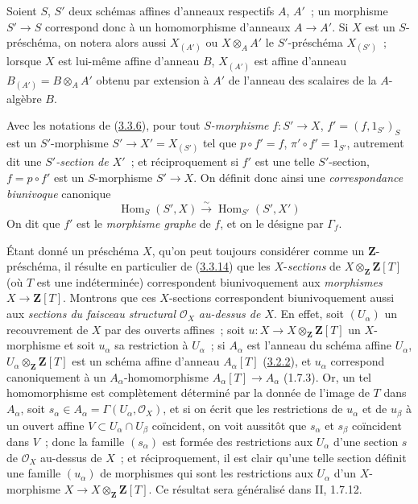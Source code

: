\begin{env}[3.3.13]
\label{I.3.3.13-fr}
Soient $S$, $S'$ deux schémas affines d'anneaux respectifs $A$, $A'$~; un
morphisme $S'\to S$ correspond donc à un homomorphisme d'anneaux $A\to A'$.
Si $X$ est un $S$-préschéma, on notera alors aussi $X_{(A')}$ ou
$X\otimes_A A'$ le $S'$-préschéma $X_{(S')}$~; lorsque $X$ est lui-même
affine d'anneau $B$, $X_{(A')}$ est affine d'anneau
$B_{(A')}=B\otimes_A A'$ obtenu par extension à $A'$ de l'anneau des scalaires
de la $A$-algèbre $B$.
\end{env}

\begin{env}[3.3.14]
\label{I.3.3.14-fr}
Avec les notations de (\hyperref[I.3.3.6-fr]{3.3.6}), pour tout
\emph{$S$-morphisme} $f:S'\to X$, $f'=(f,1_{S'})_S$ est un $S'$-morphisme
$S'\to X'=X_{(S')}$ tel que $p\circ f'=f$, $\pi'\circ f'=1_{S'}$, autrement
dit une \emph{$S'$-section de $X'$}~; et réciproquement si $f'$ est une telle
$S'$-section, $f=p\circ f'$ est un $S$-morphisme $S'\to X$. On définit donc
ainsi une \emph{correspondance biunivoque} canonique
\label{I.3.3.14.correspondence-fr}
\[
  \operatorname{Hom}_S(S',X)\overset{\sim}{\longrightarrow}
  \operatorname{Hom}_{S'}(S',X')
\]
On dit que $f'$ est le \emph{morphisme graphe} de $f$, et on le désigne par
$\Gamma_f$.
\end{env}

\begin{env}[3.3.15]
\label{I.3.3.15-fr}
Étant donné un préschéma $X$, qu'on peut toujours considérer comme un
$\mathbf{Z}$-préschéma, il résulte en particulier de
(\hyperref[I.3.3.14-fr]{3.3.14}) que les $X$-\emph{sections} de
$X\otimes_{\mathbf{Z}}\mathbf{Z}[T]$ (où $T$ est une indéterminée)
correspondent biunivoquement aux \emph{morphismes}
$X\to\mathbf{Z}[T]$. Montrons que ces $X$-sections correspondent
biunivoquement aussi aux \emph{sections du faisceau structural
$\mathcal{O}_X$ au-dessus de $X$}. En effet, soit $(U_\alpha)$ un recouvrement
de $X$ par des ouverts affines~; soit
$u:X\to X\otimes_{\mathbf{Z}}\mathbf{Z}[T]$ un $X$-morphisme et soit
$u_\alpha$ sa restriction à $U_\alpha$~; si $A_\alpha$ est l'anneau du schéma
affine $U_\alpha$, $U_\alpha\otimes_{\mathbf{Z}}\mathbf{Z}[T]$ est un schéma
affine d'anneau $A_\alpha[T]$ (\hyperref[I.3.2.2-fr]{3.2.2}), et $u_\alpha$
correspond canoniquement à un $A_\alpha$-homomorphisme
$A_\alpha[T]\to A_\alpha$ (1.7.3). Or, un tel homomorphisme est complètement
déterminé par la donnée de l'image de $T$ dans $A_\alpha$, soit
$s_\alpha\in A_\alpha=\Gamma(U_\alpha,\mathcal{O}_X)$, et si on écrit que les
restrictions de $u_\alpha$ et de $u_\beta$ à un ouvert affine
$V\subset U_\alpha\cap U_\beta$ coïncident, on voit aussitôt que $s_\alpha$
et $s_\beta$ coïncident dans $V$~; donc la famille $(s_\alpha)$ est formée des
restrictions aux $U_\alpha$ d'une section $s$ de $\mathcal{O}_X$ au-dessus de
$X$~; et réciproquement, il est clair qu'une telle section définit une famille
$(u_\alpha)$ de morphismes qui sont les restrictions aux $U_\alpha$ d'un
$X$-morphisme $X\to X\otimes_{\mathbf{Z}}\mathbf{Z}[T]$. Ce résultat sera
généralisé dans II, 1.7.12.
\end{env}

